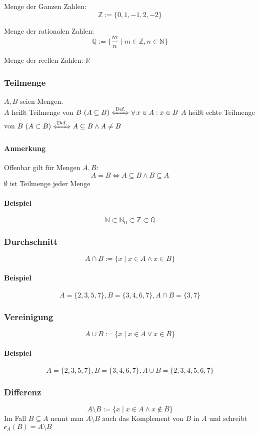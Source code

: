 \documentclass[a4paper]{scrartcl}
\DeclareMathOperator{\Forall}{\forall}
\theoremstyle{definition}
\theoremstyle{plain}
\theoremstyle{plain}
\theoremstyle{remark}
\theoremstyle{remark}
\theoremstyle{remark}
\theoremstyle{remark}
\theoremstyle{remark}
\begin{document}
Menge der Ganzen Zahlen:
\[\mathbb{Z} := \{0,1,-1,2,-2\}\]

Menge der rationalen Zahlen:
\[\mathbb{Q} := \{\frac{m}{n} \mid m\in\mathbb{Z}, n\in\mathbb{N}\}\]

Menge der reellen Zahlen: $\mathbb{R}$

\subsubsection{Teilmenge}
\label{sec-2-4-5}
$A,B$ seien Mengen. \\
        $A$ heißt Teilmenge von $B~(A\subseteq B) \xLeftrightarrow{\text{Def.}} \Forall x\in A: x\in B$
$A$ heißt echte Teilmenge von $B~(A\subset B) \xLeftrightarrow{\text{Def.}} A\subseteq B \wedge A\neq B$
\paragraph{Anmerkung}
\label{sec-2-4-5-1}
Offenbar gilt für Mengen $A,B$:
\[A=B \iff A\subseteq B \wedge B\subseteq A\]
$\emptyset$ ist Teilmenge jeder Menge

\paragraph{Beispiel}
\label{sec-2-4-5-2}
\[\mathbb{N}\subset\mathbb{N}_0\subset\mathbb{Z}\subset\mathbb{Q}\]

\subsubsection{Durchschnitt}
\label{sec-2-4-6}
\[A \cap B := \{x\mid x\in A \wedge x\in B\}\]
\paragraph{Beispiel}
\label{sec-2-4-6-1}
\[A=\{2,3,5,7\}, B=\{3,4,6,7\}, A\cap B = \{3,7\}\]

\subsubsection{Vereinigung}
\label{sec-2-4-7}
\[A\cup B := \{x\mid x\in A \vee x\in B\}\]
\paragraph{Beispiel}
\label{sec-2-4-7-1}
\[A=\{2,3,5,7\}, B=\{3,4,6,7\}, A\cup B = \{2,3,4,5,6,7\}\]

\subsubsection{Differenz}
\label{sec-2-4-8}
\[A\setminus B := \{x\mid x\in A \wedge x\not\in B\}\]
Im Fall $B\subseteq A$ nennt man $A\setminus B$ auch das Komplement von $B$ in $A$ und schreibt $\mathcal{c}_A(B) = A\setminus B$
\end{document}
